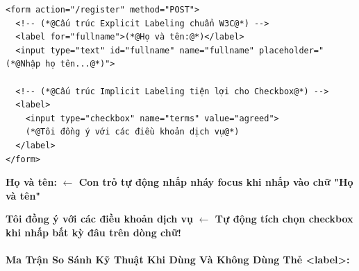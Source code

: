 \documentclass[11pt,oneside]{book}
\begin{document}
\begin{codeWindow}
\begin{lstlisting}[language=HTML5]
<form action="/register" method="POST">
  <!-- (*@Cấu trúc Explicit Labeling chuẩn W3C@*) -->
  <label for="fullname">(*@Họ và tên:@*)</label>
  <input type="text" id="fullname" name="fullname" placeholder="(*@Nhập họ tên...@*)">
  
  <!-- (*@Cấu trúc Implicit Labeling tiện lợi cho Checkbox@*) -->
  <label>
    <input type="checkbox" name="terms" value="agreed">
    (*@Tôi đồng ý với các điều khoản dịch vụ@*)
  </label>
</form>
\end{lstlisting}
\end{codeWindow}

\begin{browserWindow}
\sffamily\small
\begin{tcolorbox}[enhanced, colback=white, colframe=primaryBlue!30, arc=6pt, boxrule=0.8pt, left=12pt, right=12pt, top=10pt, bottom=10pt]
  \textbf{Họ và tên:} \quad \tcbox[on line, arc=4pt, colback=primaryBlue!5, colframe=primaryBlue, boxsep=3pt, left=8pt, right=40pt]{\textcolor{darkText}{Nguyễn Văn A} \;\textcolor{primaryBlue}{\textbf{|}}} \quad \textcolor{primaryBlue}{\small\textbf{$\leftarrow$ Con trỏ tự động nhấp nháy focus khi nhấp vào chữ "Họ và tên"}}
  
  \vspace{10pt}
  
   \;\textbf{Tôi đồng ý với các điều khoản dịch vụ} \quad \textcolor{secondaryTeal}{\small\textbf{$\leftarrow$ Tự động tích chọn checkbox khi nhấp bất kỳ đâu trên dòng chữ!}}
\end{tcolorbox}
\end{browserWindow}

\paragraph{Ma Trận So Sánh Kỹ Thuật Khi Dùng Và Không Dùng Thẻ <label>:}
\end{document}

